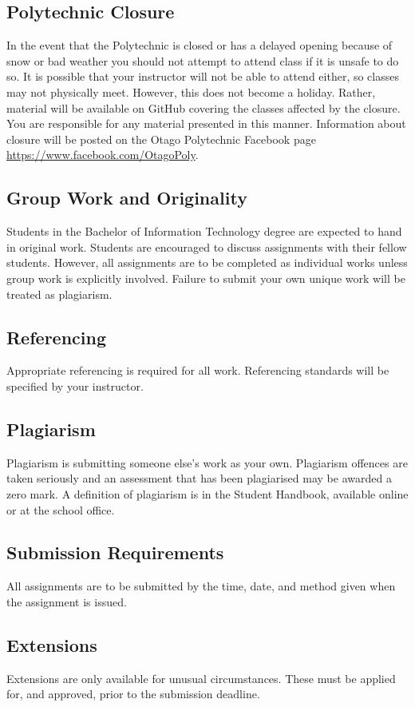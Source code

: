 \documentclass{article}
\begin{document}
\subsection*{Polytechnic Closure}
In the event that the Polytechnic is closed or has a delayed opening because of snow or bad weather you should not attempt to attend class if it is unsafe to do so. It is possible that your instructor will not be able to attend either, so classes may not physically meet. However, this does not become a holiday. Rather, material will be available on GitHub covering the classes affected by the closure. You are responsible for any material presented in this manner. Information about closure will be posted on the Otago Polytechnic Facebook page \url{https://www.facebook.com/OtagoPoly}.

\subsection*{Group Work and Originality}
Students in the Bachelor of Information Technology degree are expected to hand in original work.  Students are encouraged to discuss assignments with their fellow students.  However, all assignments are to be completed as individual works unless group work is explicitly involved. Failure to submit your own unique work will be treated as plagiarism.

\subsection*{Referencing}
Appropriate referencing is required for all work.  Referencing standards will be specified by your instructor.

\subsection*{Plagiarism}
Plagiarism is submitting someone else's work as your own.  Plagiarism offences are taken seriously and an assessment that has been plagiarised may be awarded a zero mark.  A definition of plagiarism is in the Student Handbook, available online or at the school office.

\subsection*{Submission Requirements}
All assignments are to be submitted by the time, date, and method given when the assignment is issued.

\subsection*{Extensions}
Extensions are only available for unusual circumstances.  These must be applied for, and approved, prior to the submission deadline.
\end{document}
